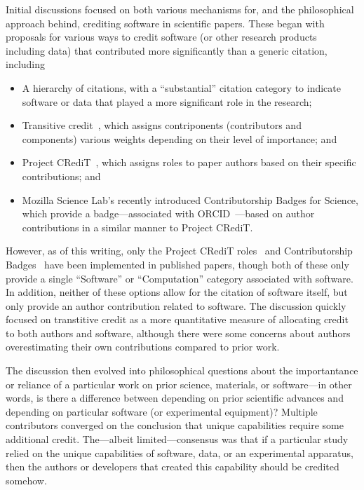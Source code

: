 Initial discussions focused on both various mechanisms for, and the philosophical approach behind, crediting software in scientific papers.
These began with proposals for various ways to credit software (or other research products including data) that contributed more significantly than a generic citation, including
\begin{itemize}
    \item A hierarchy of citations, with a ``substantial'' citation category to indicate software or data that played a more significant role in the research;
    \item Transitive credit~\cite{wssspe2_katz,Katz:2014_tc}, which assigns contriponents (contributors and components) various weights depending on their level of importance; and
    \item Project CRediT~\cite{projectcredit}, which assigns roles to paper authors based on their specific contributions; and
    \item Mozilla Science Lab's recently introduced Contributorship Badges for Science, which provide a badge---associated with ORCID~\cite{orcid}---based on author contributions in a similar manner to Project CRediT.
\end{itemize}
However, as of this writing, only the Project CRediT roles~\cite{McCall2015_credit,Lin2015_credit} and Contributorship Badges~\cite{} have been implemented in published papers, though both of these only provide a single ``Software'' or ``Computation'' category associated with software.
In addition, neither of these options allow for the citation of software itself, but only provide an author contribution related to software.
The discussion quickly focused on transtitive credit as a more quantitative measure of allocating credit to both authors and software, although there were some concerns about authors overestimating their own contributions compared to prior work.

The discussion then evolved into philosophical questions about the importantance or reliance of a particular work on prior science, materials, or software---in other words, is there a difference between depending on prior scientific advances and depending on particular software (or experimental equipment)?
Multiple contributors converged on the conclusion that unique capabilities require some additional credit.
The---albeit limited---consensus was that if a particular study relied on the unique capabilities of software, data, or an experimental apparatus, then the authors or developers that created this capability should be credited somehow.


